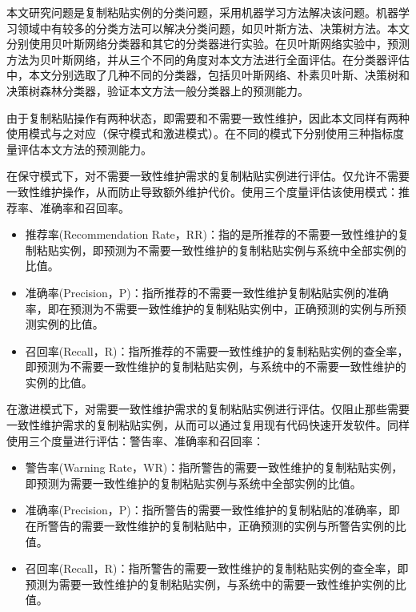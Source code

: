 
本文研究问题是复制粘贴实例的分类问题，采用机器学习方法解决该问题。机器学习领域中有较多的分类方法可以解决分类问题，如贝叶斯方法、决策树方法。本文分别使用贝叶斯网络分类器和其它的分类器进行实验。在贝叶斯网络实验中，预测方法为贝叶斯网络，并从三个不同的角度对本文方法进行全面评估。在分类器评估中，本文分别选取了几种不同的分类器，包括贝叶斯网络、朴素贝叶斯、决策树和决策树森林分类器，验证本文方法一般分类器上的预测能力。

由于复制粘贴操作有两种状态，即需要和不需要一致性维护，因此本文同样有两种使用模式与之对应（保守模式和激进模式）。在不同的模式下分别使用三种指标度量评估本文方法的预测能力。

在保守模式下，对不需要一致性维护需求的复制粘贴实例进行评估。仅允许不需要一致性维护操作，从而防止导致额外维护代价。使用三个度量评估该使用模式：推荐率、准确率和召回率。
\begin{itemize}
\item	推荐率(Recommendation Rate，RR)：指的是所推荐的不需要一致性维护的复制粘贴实例，即预测为不需要一致性维护的复制粘贴实例与系统中全部实例的比值。
\item  准确率(Precision，P)：指所推荐的不需要一致性维护复制粘贴实例的准确率，即在预测为不需要一致性维护的复制粘贴实例中，正确预测的实例与所预测实例的比值。
\item  召回率(Recall，R)：指所推荐的不需要一致性维护的复制粘贴实例的查全率，即预测为不需要一致性维护的复制粘贴实例，与系统中的不需要一致性维护的实例的比值。
\end{itemize}

在激进模式下，对需要一致性维护需求的复制粘贴实例进行评估。仅阻止那些需要一致性维护需求的复制粘贴实例，从而可以通过复用现有代码快速开发软件。同样使用三个度量进行评估：警告率、准确率和召回率：
\begin{itemize}
\item	警告率(Warning Rate，WR)：指所警告的需要一致性维护的复制粘贴实例，即预测为需要一致性维护的复制粘贴实例与系统中全部实例的比值。
\item	准确率(Precision，P)：指所警告的需要一致性维护的复制粘贴的准确率，即在所警告的需要一致性维护的复制粘贴中，正确预测的实例与所警告实例的比值。
\item	召回率(Recall，R)：指所警告的需要一致性维护的复制粘贴实例的查全率，即预测为需要一致性维护的复制粘贴实例，与系统中的需要一致性维护实例的比值。
\end{itemize}



